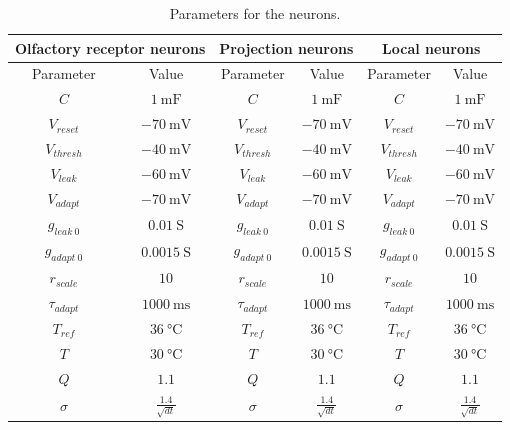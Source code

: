   \begin{table}
    \centering
    \begin{tabular}{ c c | c c | c c }
      \hline
      \multicolumn{2}{c}{Olfactory receptor neurons} & \multicolumn{2}{c}{Projection neurons} & \multicolumn{2}{c}{Local neurons} \\
      \hline
      Parameter & Value & Parameter & Value & Parameter & Value \\
      $C$ & $\SI{1}{\milli\farad}$ & $C$ & $\SI{1}{\milli\farad}$ & $C$ & $\SI{1}{\milli\farad}$ \\
      $V_{reset}$ & $\SI{-70}{\milli\volt}$ & $V_{reset}$ & $\SI{-70}{\milli\volt}$ & $V_{reset}$ & $\SI{-70}{\milli\volt}$ \\
      $V_{thresh}$ & $\SI{-40}{\milli\volt}$ & $V_{thresh}$ & $\SI{-40}{\milli\volt}$ & $V_{thresh}$ & $\SI{-40}{\milli\volt}$ \\
      $V_{leak}$ & $\SI{-60}{\milli\volt}$ & $V_{leak}$ & $\SI{-60}{\milli\volt}$ & $V_{leak}$ & $\SI{-60}{\milli\volt}$ \\
      $V_{adapt}$ & $\SI{-70}{\milli\volt}$ & $V_{adapt}$ & $\SI{-70}{\milli\volt}$ & $V_{adapt}$ & $\SI{-70}{\milli\volt}$ \\
      $g_{leak\ 0}$ & $\SI{0.01}{\siemens}$ & $g_{leak\ 0}$ & $\SI{0.01}{\siemens}$ & $g_{leak\ 0}$ & $\SI{0.01}{\siemens}$ \\
      $g_{adapt\ 0}$ & $\SI{0.0015}{\siemens}$ & $g_{adapt\ 0}$ & $\SI{0.0015}{\siemens}$ & $g_{adapt\ 0}$ & $\SI{0.0015}{\siemens}$ \\
      $r_{scale}$ & $10$ & $r_{scale}$ & $10$ & $r_{scale}$ & $10$ \\
      $\tau_{adapt}$ & $\SI{1000}{\milli\second}$ & $\tau_{adapt}$ & $\SI{1000}{\milli\second}$ & $\tau_{adapt}$ & $\SI{1000}{\milli\second}$ \\
      $T_{ref}$ & $\SI{36}{\celsius}$ & $T_{ref}$ & $\SI{36}{\celsius}$ & $T_{ref}$ & $\SI{36}{\celsius}$ \\
      $T$ & $\SI{30}{\celsius}$ & $T$ & $\SI{30}{\celsius}$ & $T$ & $\SI{30}{\celsius}$ \\
      $Q$ & $1.1$ & $Q$ & $1.1$ & $Q$ & $1.1$ \\
      $\sigma$ & $\frac{1.4}{\sqrt{dt}}$ & $\sigma$ & $\frac{1.4}{\sqrt{dt}}$ & $\sigma$ & $\frac{1.4}{\sqrt{dt}}$ \\
      \hline
    \end{tabular}
    \caption{Parameters for the neurons.}
    \label{tab:neuron-parameters}
  \end{table}

